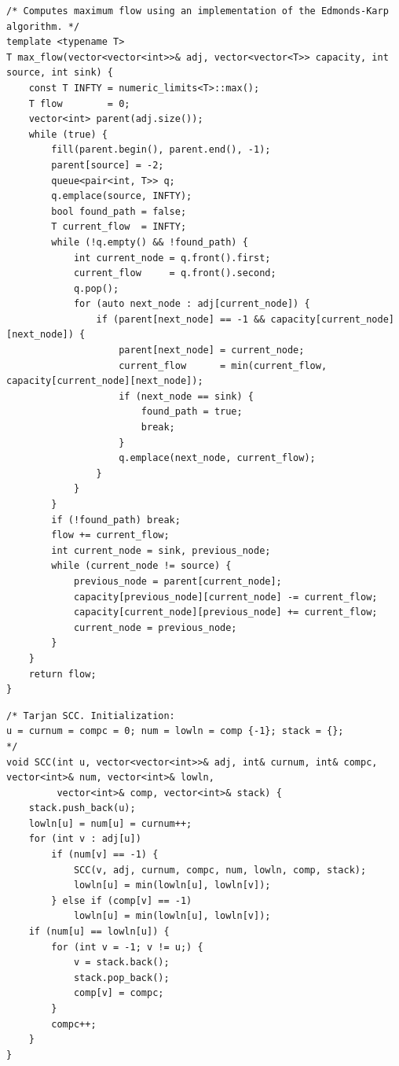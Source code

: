 \documentclass[a4paper,10pt]{article}
\newenvironment{keepfunction}{\begin{samepage}}{\end{samepage}}
\begin{document}
\begin{keepfunction}
\begin{verbatim}
/* Computes maximum flow using an implementation of the Edmonds-Karp algorithm. */
template <typename T>
T max_flow(vector<vector<int>>& adj, vector<vector<T>> capacity, int source, int sink) {
    const T INFTY = numeric_limits<T>::max();
    T flow        = 0;
    vector<int> parent(adj.size());
    while (true) {
        fill(parent.begin(), parent.end(), -1);
        parent[source] = -2;
        queue<pair<int, T>> q;
        q.emplace(source, INFTY);
        bool found_path = false;
        T current_flow  = INFTY;
        while (!q.empty() && !found_path) {
            int current_node = q.front().first;
            current_flow     = q.front().second;
            q.pop();
            for (auto next_node : adj[current_node]) {
                if (parent[next_node] == -1 && capacity[current_node][next_node]) {
                    parent[next_node] = current_node;
                    current_flow      = min(current_flow, capacity[current_node][next_node]);
                    if (next_node == sink) {
                        found_path = true;
                        break;
                    }
                    q.emplace(next_node, current_flow);
                }
            }
        }
        if (!found_path) break;
        flow += current_flow;
        int current_node = sink, previous_node;
        while (current_node != source) {
            previous_node = parent[current_node];
            capacity[previous_node][current_node] -= current_flow;
            capacity[current_node][previous_node] += current_flow;
            current_node = previous_node;
        }
    }
    return flow;
}
\end{verbatim}
\end{keepfunction}

\begin{keepfunction}
\begin{verbatim}
/* Tarjan SCC. Initialization:
u = curnum = compc = 0; num = lowln = comp {-1}; stack = {};
*/
void SCC(int u, vector<vector<int>>& adj, int& curnum, int& compc, vector<int>& num, vector<int>& lowln,
         vector<int>& comp, vector<int>& stack) {
    stack.push_back(u);
    lowln[u] = num[u] = curnum++;
    for (int v : adj[u])
        if (num[v] == -1) {
            SCC(v, adj, curnum, compc, num, lowln, comp, stack);
            lowln[u] = min(lowln[u], lowln[v]);
        } else if (comp[v] == -1)
            lowln[u] = min(lowln[u], lowln[v]);
    if (num[u] == lowln[u]) {
        for (int v = -1; v != u;) {
            v = stack.back();
            stack.pop_back();
            comp[v] = compc;
        }
        compc++;
    }
}
\end{verbatim}
\end{keepfunction}
\end{document}
